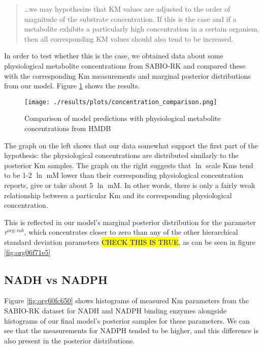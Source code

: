\documentclass[11pt]{article}
\begin{document}
\begin{quote}
\ldots{}we may hypothesize that KM values are adjusted to the order of magnitude of
the substrate concentration. If this is the case and if a metabolite exhibits a
particularly high concentration in a certain organism, then all corresponding KM
values should also tend to be increased.
\end{quote}

In order to test whether this is the case, we obtained data about some
physiological metabolite concentrations from SABIO-RK and compared these with
the corresponding Km measurements and marginal posterior distributions from our
model. Figure \ref{fig:orgd03c95e} shows the results.

\begin{figure}[htbp]
\centering
\texttt{[image: ./results/plots/concentration\_comparison.png]}
\caption{\label{fig:orgd03c95e}Comparison of model predictions with physiological metabolite concentrations from HMDB}
\end{figure}

The graph on the left shows that our data somewhat support the first part of the
hypothesis: the physiological concentrations are distributed similarly to the
posterior Km samples. The graph on the right suggests that \(\ln\) scale Kms tend
to be 1-2 \(\ln\) mM lower than their corresponding physiological concentration
reports, give or take about 5 \(\ln\) mM. In other words, there is only a fairly
weak relationship between a particular Km and its corresponding physiological
concentration.

This is reflected in our model's marginal posterior distribution for the
parameter \(\tau^{org:sub}\), which concentrates closer to zero than any of the
other hierarchical standard deviation parameters \hl{CHECK THIS IS TRUE}, as can be
seen in figure \ref{fig:org06f71e5}

\subsection{NADH vs NADPH}
\label{sec:org1506f49}

Figure \ref{fig:org60fc650} shows histograms of measured Km parameters from the SABIO-RK
dataset for NADH and NADPH binding enzymes alongside histograms of our final
model's posterior samples for these parameters. We can see that the measurements
for NADPH tended to be higher, and this difference is also present in the posterior
distributions.
\end{document}
